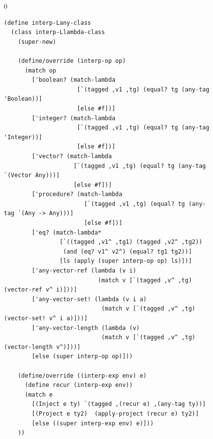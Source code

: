\documentclass[7x10]{TimesAPriori_MIT}%
\def\racketEd{0}
\def\edition{1}
\numberwithin{theorem}{chapter}
\numberwithin{definition}{chapter}
\numberwithin{equation}{chapter}
\begin{document}
\begin{figure}[tbp]
  \begin{tcolorbox}[colback=white]
{\if\edition\racketEd
\begin{lstlisting}[basicstyle=\ttfamily\footnotesize]
(define interp-Lany-class
  (class interp-Llambda-class
    (super-new)

    (define/override (interp-op op)
      (match op
        ['boolean? (match-lambda
                     [`(tagged ,v1 ,tg) (equal? tg (any-tag 'Boolean))]
                     [else #f])]
        ['integer? (match-lambda
                     [`(tagged ,v1 ,tg) (equal? tg (any-tag 'Integer))]
                     [else #f])]
        ['vector? (match-lambda
                    [`(tagged ,v1 ,tg) (equal? tg (any-tag `(Vector Any)))]
                    [else #f])]
        ['procedure? (match-lambda
                       [`(tagged ,v1 ,tg) (equal? tg (any-tag `(Any -> Any)))]
                       [else #f])]
        ['eq? (match-lambda*
                [`((tagged ,v1^ ,tg1) (tagged ,v2^ ,tg2))
                 (and (eq? v1^ v2^) (equal? tg1 tg2))]
                [ls (apply (super interp-op op) ls)])]
        ['any-vector-ref (lambda (v i)
                           (match v [`(tagged ,v^ ,tg) (vector-ref v^ i)]))]
        ['any-vector-set! (lambda (v i a)
                            (match v [`(tagged ,v^ ,tg) (vector-set! v^ i a)]))]
        ['any-vector-length (lambda (v)
                            (match v [`(tagged ,v^ ,tg) (vector-length v^)]))]
        [else (super interp-op op)]))

    (define/override ((interp-exp env) e)
      (define recur (interp-exp env))
      (match e
        [(Inject e ty) `(tagged ,(recur e) ,(any-tag ty))]
        [(Project e ty2)  (apply-project (recur e) ty2)]
        [else ((super interp-exp env) e)]))
    ))


\end{lstlisting}}
\end{tcolorbox}
\end{figure}
\end{document}
